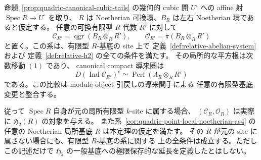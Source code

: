 \begin{theorem}
\label{thm:quadric-noetherian-relative-promotion}
命題~\ref{prop:quadric-canonical-cubic-tails} の幾何的 cubic 開
$U^\circ$ への affine 射 $\operatorname{Spec}R\to U^\circ$ を取り、
$R$ は Noetherian 可換環、$B_R$ は左右 Noetherian 環であると仮定する。
任意の可換有限型 $R$-代数 $R'$ に対して
\[
 \mathcal C_{R'}=\operatorname{qgr}(B_R\otimes_RR'),
 \qquad\mathcal O_{R'}=\pi(B_R\otimes_RR')
\]
と置く。この系は、有限型 $R$-基底の site 上で
定義~\ref{def:relative-abelian-system} および
定義~\ref{def:relative-h2} の全ての条件を満たす。
その局所的な平方根は次数移動 $(1)$ であり、
canonical compact 導来圏は
\[
 D(\operatorname{Ind}\mathcal C_{R'})^c
     \simeq\operatorname{Perf}(\Lambda_R\otimes_RR')
\]
である。この比較は module-object 引戻しの導来関手による
任意の有限型基底変更と整合する。

従って $\operatorname{Spec}R$ 自身が元の局所有限型 $k$-site に属する場合、
$(\mathcal C_R,\mathcal O_R)$ は実際に
$\mathfrak H_2(R)$ の対象を与える。
また系~\ref{cor:quadric-point-local-noetherian-as4} の任意の
Noetherian 局所基底 $R$ は本定理の仮定を満たす。
その $R$ が元の site に属さない場合にも、有限型 $R$-基底の系に関する
上の全条件は成立する。ただしこの記述だけで
$\mathfrak H_2$ の一般基底への極限保存的な延長を定義したとはしない。
\end{theorem}
